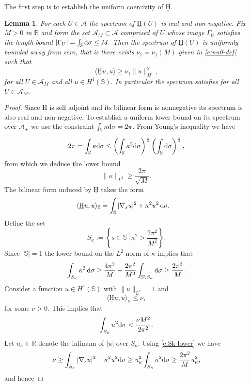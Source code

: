 \documentclass[11pt]{amsart}
\theoremstyle{plain}
\newcommand{\beq}{\begin{equation}}
\newcommand{\eeq}{\end{equation}}
\def\cA{{\mathcal A}}
\def\mbbR{\mathbb{R}}
\def\mbbS{\mathbb{S}}
\def\mrH{\textrm H}
\def\mrd{\textrm d}
\def\mrH{\underline{\mathrm{H}}}
\def\rmd{\mathrm d}
\numberwithin{equation}{section}
\theoremstyle{plain}
\newtheorem{lemma}[thm]{Lemma}
\begin{document}
The first step is to establish the uniform coercivity of $\mrH.$
\begin{lemma}
\label{l:H_coerc}
For each $U\in\cA$ the spectrum of $\mrH(U)$ is real and non-negative. Fix $M>0$ in $\mbbR$ and form  the set $\cA_M\subset\cA$ comprised of $U$  whose image $\Gamma_U$ satisfies the length bound $|\Gamma_U|=\int_\mbbS \mrd\sigma \leq M.$  Then the spectrum of $\mrH(U)$ is uniformly bounded away from zero, that is there exists $\nu_1=\nu_1(M)$ given in \eqref{e:nu0-def} such that
\beq\label{e:H-L2coer}
\langle \mrH u,u\rangle \geq \nu_1 \|u\|_{H^1}^2,
\eeq
for all $U\in\cA_M$ and all $u\in H^1(\mbbS).$
In particular the spectrum satisfies  for all $U\in\cA_M.$ 
\end{lemma}
\begin{proof}
Since $\mrH$ is self adjoint and its bilinear form is nonnegative its spectrum is also real and non-negative. 
To establish a uniform lower  bound on its spectrum over $\cA_+$ we use the constraint $\int_\mbbS \kappa\mrd \sigma= 2\pi$. 
From Young's inequality we have
$$\begin{aligned}
2\pi =\int_\mbbS \kappa  \rmd \sigma &\leq \left(\int_\mbbS\kappa^2\mrd\sigma\right)^\frac12 \left(\int_\mbbS\mrd\sigma\right)^\frac12,\\
\end{aligned}
$$
from which we deduce the lower bound
$$
\| \kappa \|_{L^2} \geq  \frac{2\pi}{\sqrt{M}}.
$$
The bilinear form induced by $\mrH$ takes the form
$$\begin{aligned}
    \langle \mrH u, u\rangle_\mbbS&=\int_\mbbS |\nabla_s u|^2+\kappa^2u^2 \,\mrd \sigma.
\end{aligned}$$
 Define the set 
 $$S_\kappa:=\left\{s\in\mbbS\,\bigl|\,\kappa^2>\frac{2\pi^2}{M^2}\right\}.$$ 
 Since $|\mbbS|=1$ the lower bound on the $L^2$ norm of $\kappa$ implies that
\beq\label{e:Sk-lower}\int_{S_\kappa}\kappa^2\,\mrd\sigma \ge \frac{4\pi^2}{M}-\frac{2\pi^2}{M^2}\int_{\mbbS\backslash S_\kappa} \mrd\sigma \geq \frac{2\pi^2}{M}.\eeq
Consider a function $u\in H^1(\mbbS)$
with $\|u\|_{L^2}=1$ and
$$  \langle \mrH u, u\rangle_\mbbS\leq \nu,$$
for some $\nu>0.$
This implies that
$$ \int_{S_\kappa} u^2\mrd \sigma<\frac{\nu M^2}{2\pi^2}.$$
Let $u_\kappa\in\mbbR$ denote the infimum of $|u|$ over $S_\kappa.$ Using \eqref{e:Sk-lower} we have
$$ \nu\geq \int_{S_\kappa} |\nabla_s u|^2+\kappa^2 u^2\mrd \sigma \geq u_\kappa^2 \int_{S_\kappa}\kappa^2\mrd\sigma\geq  \frac{2\pi^2}{M} u_\kappa^2,$$
and hence

\end{proof}
\end{document}
